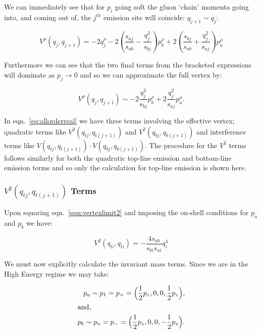 		We can immediately see that for $p_i$ going soft the gluon `chain' momenta going into,
		and coming out of, the $j^{th}$ emission site will coincide: $q_{j+1}\sim q_j$:

		\begin{equation}
			V^\rho(q_j, q_{j+1}) = -2q_j^\rho - 2\left(\frac{s_{aj}}{s_{ab}} -
				\frac{q^2_{j}}{s_{bj}}\right)p_b^\rho + 2\left(\frac{s_{bj}}{s_{ab}} +
				\frac{q_j^2}{s_{aj}}\right)p_a^\rho
				\label{eqn:vertexlimit}
		\end{equation}

		Furthermore we can see that the two final terms from the bracketed expressions will dominate
		as $p_j\to0$ and so we can approximate the full vertex by:

		\begin{equation}
			V^\rho(q_j, q_{j+1}) \sim -2\frac{q^2_{j}}{s_{bj}}p_b^\rho + 2\frac{q_j^2}{s_{aj}}p_a^\rho.
				\label{eqn:vertexlimit2}
		\end{equation}

		In eqn.~\eqref{eq:allorderreal} we have three terms involving the effective vertex;
		quadratic terms like $V^2(q_{tj}, q_{t(j+1)})$ and $V^2(q_{bj}, q_{b(j+1)})$ and interference terms
		like $V(q_{tj}, q_{t(j+1)})\cdot V(q_{bj}, q_{b(j+1)})$.  The procedure for the $V^2$ terms follows
		similarly for both the quadratic top-line emission and bottom-line emission terms and so only
		the calculation for top-line emission is shown here.

		\subsubsection{$V^2(q_{tj}, q_{t(j+1)})$ Terms}

			Upon squaring eqn.~\eqref{eqn:vertexlimit2} and imposing the on-shell conditions for
			$p_a$ and $p_b$ we have:

			\begin{equation}
				V^2(q_{ti}, q_{ti}) = - \frac{4s_{ab}}{s_{bi}s_{ai}}q^4_{i}
				\label{eqn:temp}
			\end{equation}

			We must now explicitly calculate the invariant mass terms.  Since we are in the
			High Energy regime we may take:

			\begin{align}
				p_a\sim p_1 = p_+ = \Big(\frac12 p_z, 0, 0, \frac12 p_z\Big),\\
				\intertext{and,}
				p_b\sim p_n = p_- = \Big(\frac12 p_z, 0, 0, -\frac12 p_z\Big).
			\end{align}

